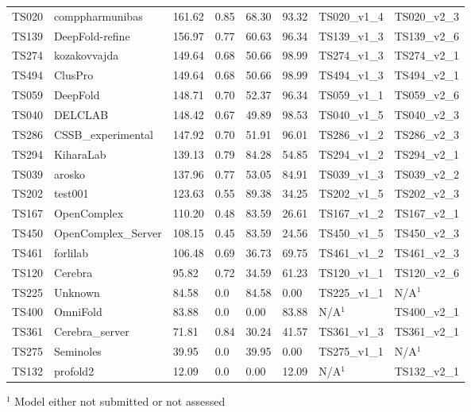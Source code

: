 \begin{table}[ht]
{\begin{tabular}{llllllll}
TS020 & comppharmunibas & 161.62 & 0.85 & 68.30 & 93.32 & TS020\_v1\_4 & TS020\_v2\_3 \\ 
TS139 & DeepFold-refine & 156.97 & 0.77 & 60.63 & 96.34 & TS139\_v1\_3 & TS139\_v2\_6 \\ 
TS274 & kozakovvajda & 149.64 & 0.68 & 50.66 & 98.99 & TS274\_v1\_3 & TS274\_v2\_1 \\ 
TS494 & ClusPro & 149.64 & 0.68 & 50.66 & 98.99 & TS494\_v1\_3 & TS494\_v2\_1 \\ 
TS059 & DeepFold & 148.71 & 0.70 & 52.37 & 96.34 & TS059\_v1\_1 & TS059\_v2\_6 \\ 
TS040 & DELCLAB & 148.42 & 0.67 & 49.89 & 98.53 & TS040\_v1\_5 & TS040\_v2\_3 \\ 
TS286 & CSSB\_experimental & 147.92 & 0.70 & 51.91 & 96.01 & TS286\_v1\_2 & TS286\_v2\_3 \\ 
TS294 & KiharaLab & 139.13 & 0.79 & 84.28 & 54.85 & TS294\_v1\_2 & TS294\_v2\_1 \\ 
TS039 & arosko & 137.96 & 0.77 & 53.05 & 84.91 & TS039\_v1\_3 & TS039\_v2\_2 \\ 
TS202 & test001 & 123.63 & 0.55 & 89.38 & 34.25 & TS202\_v1\_5 & TS202\_v2\_3 \\ 
TS167 & OpenComplex & 110.20 & 0.48 & 83.59 & 26.61 & TS167\_v1\_2 & TS167\_v2\_1 \\ 
TS450 & OpenComplex\_Server & 108.15 & 0.45 & 83.59 & 24.56 & TS450\_v1\_5 & TS450\_v2\_3 \\ 
TS461 & forlilab & 106.48 & 0.69 & 36.73 & 69.75 & TS461\_v1\_2 & TS461\_v2\_3 \\ 
TS120 & Cerebra & 95.82 & 0.72 & 34.59 & 61.23 & TS120\_v1\_1 & TS120\_v2\_6 \\ 
TS225 & Unknown & 84.58 & 0.0 & 84.58 & 0.00 & TS225\_v1\_1 & N/A$^{1}$ \\ 
TS400 & OmniFold & 83.88 & 0.0 & 0.00 & 83.88 & N/A$^{1}$ & TS400\_v2\_1 \\ 
TS361 & Cerebra\_server & 71.81 & 0.84 & 30.24 & 41.57 & TS361\_v1\_3 & TS361\_v2\_1 \\ 
TS275 & Seminoles & 39.95 & 0.0 & 39.95 & 0.00 & TS275\_v1\_1 & N/A$^{1}$ \\ 
TS132 & profold2 & 12.09 & 0.0 & 0.00 & 12.09 & N/A$^{1}$ & TS132\_v2\_1 \\ 
\bottomrule
\end{tabular}%
}
\begin{flushleft}\footnotesize $^{1}$ Model either not submitted or not assessed\end{flushleft}
\end{table}
